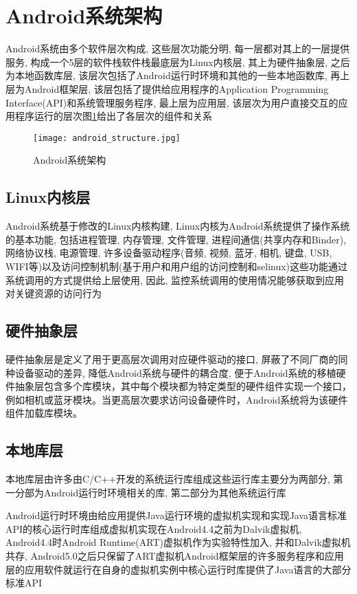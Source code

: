 \section{Android系统架构}
Android系统由多个软件层次构成, 这些层次功能分明, 每一层都对其上的一层提供服务, 构成一个5层的软件栈\juhao 软件栈最底层为Linux内核层, 其上为硬件抽象层, 之后为本地函数库层, 该层次包括了Android运行时环境和其他的一些本地函数库, 再上层为Android框架层, 该层包括了提供给应用程序的Application Programming Interface(API)和系统管理服务程序, 最上层为应用层, 该层次为用户直接交互的应用程序运行的层次\juhao  图\ref{androidStructure}给出了各层次的组件和关系\juhao
\begin{figure}[ht]
\centering
\texttt{[image: android\_structure.jpg]}
\caption{Android系统架构}
\label{androidStructure}
\end{figure}

\subsection*{Linux内核层} 
Android系统基于修改的Linux内核构建, Linux内核为Android系统提供了操作系统的基本功能, 包括进程管理, 内存管理, 文件管理, 进程间通信(共享内存和Binder), 网络协议栈, 电源管理, 许多设备驱动程序(音频, 视频, 蓝牙, 相机, 键盘, USB, WIFI等)以及访问控制机制(基于用户和用户组的访问控制和selinux)\juhao 这些功能通过系统调用的方式提供给上层使用, 因此, 监控系统调用的使用情况能够获取到应用对关键资源的访问行为\juhao

\subsection*{硬件抽象层}
硬件抽象层是定义了用于更高层次调用对应硬件驱动的接口, 屏蔽了不同厂商的同种设备驱动的差异, 降低Android系统与硬件的耦合度, 便于Android系统的移植\juhao 硬件抽象层包含多个库模块，其中每个模块都为特定类型的硬件组件实现一个接口，例如相机或蓝牙模块。当更高层次要求访问设备硬件时，Android系统将为该硬件组件加载库模块。

\subsection*{本地库层}
本地库层由许多由C/C++开发的系统运行库组成\juhao 这些运行库主要分为两部分, 第一分部为Android运行时环境相关的库, 第二部分为其他系统运行库\juhao 

Android运行时环境由给应用提供Java运行环境的虚拟机实现和实现Java语言标准API的核心运行时库组成\juhao 虚拟机实现在Android4.4之前为Dalvik虚拟机, Android4.4时Android Runtime(ART)虚拟机作为实验特性加入, 并和Dalvik虚拟机共存, Android5.0之后只保留了ART虚拟机\juhao Android框架层的许多服务程序和应用层的应用软件就运行在自身的虚拟机实例中\juhao 核心运行时库提供了Java语言的大部分标准API\juhao

